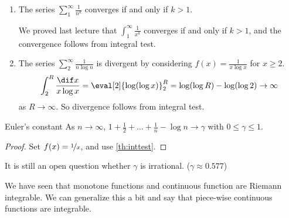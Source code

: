 \begin{example}
    \begin{enumerate}
        \item The series \(\sum_1^\infty \frac{1}{n^k}\) converges if and only if \(k >1\).

        We proved last lecture that \(\int^\infty_1 \frac{1}{x^k}\) converges if and only if \(k > 1\), and the convergence follows from integral test.
        \item The series \(\sum^\infty_2 \frac{1}{n \log n}\) is divergent by considering \(f(x) = \frac{1}{x \log x}\) for \(x \geq 2\).
        \[
            \int_2^R \frac{\dif x}{x\log x} = \eval[2]{\log(\log x)}^R_2 = \log(\log R) - \log(\log 2) \to \infty
        \]
        as \(R \to \infty\). So divergence follows from integral test.
    \end{enumerate}
\end{example}
\begin{corollary}{Euler's constant}{}
    As \(n \to \infty\), \(1 + \frac{1}{2} + \dots + \frac{1}{n} - \log n \to \gamma\) with \(0 \leq \gamma \leq 1\).
\end{corollary}
\begin{proof}
    Set \(f(x) = \nicefrac{1}{x}\), and use \cref{th:inttest}.
\end{proof}
\begin{remark}
    It is still an open question whether \(\gamma\) is irrational. (\(\gamma \approx 0.577\))
\end{remark}
We have seen that monotone functions and continuous function are Riemann integrable. We can generalize this a bit and say that piece-wise continuous functions are integrable.

